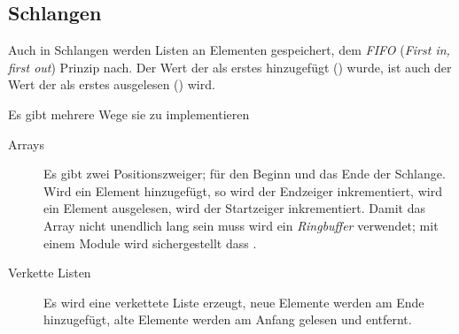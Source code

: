 \documentclass{article}
\begin{document}
\subsection{Schlangen}
Auch in Schlangen werden Listen an Elementen gespeichert, dem \emph{FIFO} (\emph{First in, first out}) Prinzip nach. Der Wert der als erstes hinzugefügt () wurde, ist auch der Wert der als erstes ausgelesen () wird.

Es gibt mehrere Wege sie zu implementieren
\begin{description}
 \item[Arrays] Es gibt zwei Positionszweiger; für den Beginn und das Ende der Schlange. Wird ein Element hinzugefügt, so wird der Endzeiger inkrementiert, wird ein Element ausgelesen, wird der Startzeiger inkrementiert. Damit das Array nicht unendlich lang sein muss wird ein \emph{Ringbuffer} verwendet; mit einem Module wird sichergestellt dass .
 \item[Verkette Listen] Es wird eine verkettete Liste erzeugt, neue Elemente werden am Ende hinzugefügt, alte Elemente werden am Anfang gelesen und entfernt.
\end{description} 
\end{document}
